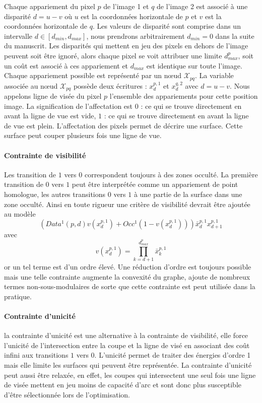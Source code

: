 \documentclass[../main/These_Mathias_Paget.tex]{subfiles}
\begin{document}
Chaque appariement du pixel $p$ de l'image 1 et $q$ de l'image 2 est associé à une disparité $d=u-v$ où $u$ est la coordonnées horizontale de $p$ et $v$ est la coordonnées horizontale de $q$. Les valeurs de disparité sont comprise dans un intervalle $d \in [d_{min},d_{max}]$, nous prendrons arbitrairement $d_{min}=0$ dans la suite du manuscrit. Les disparités qui mettent en jeu des pixels en dehors de l'image peuvent soit être ignoré, alors chaque pixel se voit attribuer une limite $d_{max}^p$, soit un coût est associé à ces appariement et $d_{max}$ est identique sur toute l'image. Chaque appariement possible est représenté par un nœud $\mathcal{X}_{pq}$. La variable associée au nœud $\mathcal{X}_{pq}$ possède deux écritures : $x^{p,1}_d$ et $x^{q,2}_d$ avec $d=u-v$. Nous appelons ligne de visée du pixel $p$ l'ensemble des appariements pour cette position image. La signification de l'affectation est $0$ : ce qui se trouve directement en avant la ligne de vue est vide, $1$ : ce qui se trouve directement en avant la ligne de vue est plein. L'affectation des pixels permet de décrire une surface. Cette surface peut couper plusieurs fois une ligne de vue.

\paragraph*{Contrainte de visibilité}
Les transition de $1$ vers $0$ correspondent toujours à des zones occulté. La première transition de $0$ vers $1$ peut être interprétée comme un appariement de point homologue, les autres transitions $0$ vers $1$ à une partie de la surface dans une zone occulté. Ainsi en toute rigueur une critère de visibilité devrait être ajoutée au modèle
\begin{equation}
\left(Data^1(p,d) v(x^{p,1}_d) + Occ^1 (1-v(x^{p,1}_d)) \right)\bar{x}^{p,1}_{d}x^{p,1}_{d+1}
\end{equation}
avec
\begin{equation}
v(x^{p,1}_d) = \prod_{k=d+1}^{d^p_{max}}{ \bar{x}^{p,1}_k}
\end{equation}
or un tel terme est d'un ordre élevé. Une réduction d'ordre est toujours possible mais une telle contrainte augmente la convexité du graphe, ajoute de nombreux termes non-sous-modulaires de sorte que cette contrainte est peut utilisée dans la pratique.

\paragraph*{Contrainte d'unicité}
la contrainte d'unicité est une alternative à la contrainte de visibilité, elle force l'unicité de l'intersection entre la coupe et la ligne de visé en associant des coût infini aux transitions $1$ vers $0$. L'unicité permet de traiter des énergies d'ordre 1 mais elle limite les surfaces qui peuvent être représentée. La contrainte d'unicité peut aussi être relaxée, en effet, les coupes qui intersectent une seul fois une ligne de visée mettent en jeu moins de capacité d'arc et sont donc plus susceptible d'être sélectionnée lors de l'optimisation.
\end{document}
